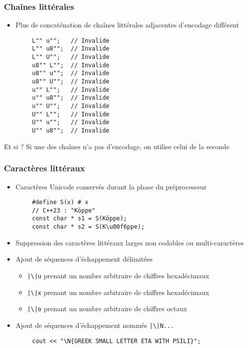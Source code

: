\documentclass[C++.tex]{subfiles}
\begin{document}
\begin{frame}[fragile]
	\frametitle{Chaînes littérales}
	\begin{itemize}
		\item Plus de concaténation de chaînes littérales adjacentes d'encodage différent
	\end{itemize}

	\begin{verbatim}
		L"" u"";   // Invalide
		L"" u8"";  // Invalide
		L"" U"";   // Invalide
		u8"" L"";  // Invalide
		u8"" u"";  // Invalide
		u8"" U"";  // Invalide
		u"" L"";   // Invalide
		u"" u8"";  // Invalide
		u"" U"";   // Invalide
		U"" L"";   // Invalide
		U"" u"";   // Invalide
		U"" u8"";  // Invalide
	\end{verbatim}

	\begin{block}{Et si  ?}
		Si une des chaînes n'a pas d'encodage, on utilise celui de la seconde
	\end{block}
\end{frame}

\begin{frame}[fragile]
	\frametitle{Caractères littéraux}
	\begin{itemize}
		\item Caractères Unicode conservés durant la phase du préprocesseur
	\end{itemize}

	\begin{verbatim}
		#define S(x) # x
		// C++23 : "Köppe"
		const char * s1 = S(Köppe);
		const char * s2 = S(K\u00f6ppe);
	\end{verbatim}


	\begin{itemize}
		\item Suppression des caractères littéraux larges non codables ou multi-caractères
		\item Ajout de séquences d'échappement délimitées


		\begin{itemize}
			\item \texttt{|\textbackslash|u{}} prenant un nombre arbitraire de chiffres hexadécimaux
			\item \texttt{|\textbackslash|x{}} prenant un nombre arbitraire de chiffres hexadécimaux
			\item \texttt{|\textbackslash|o{}} prenant un nombre arbitraire de chiffres octaux
		\end{itemize}
		\item Ajout de séquences d'échappement nommés \texttt{|\textbackslash|N{...}}
	\end{itemize}

	\begin{verbatim}
		cout << "\N{GREEK SMALL LETTER ETA WITH PSILI}";
	\end{verbatim}
\end{frame}
\end{document}
